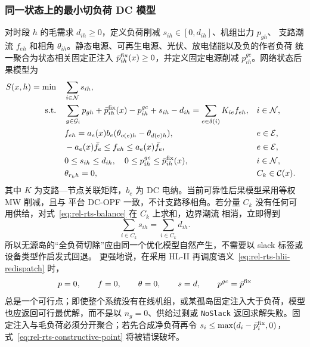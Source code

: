\subsubsection{同一状态上的最小切负荷 DC 模型}
对时段 $h$ 的毛需求 $d_{ih}\ge0$，定义负荷削减 $s_{ih}\in[0,d_{ih}]$、机组出力 $p_{gh}$、
支路潮流 $f_{eh}$ 和相角 $\theta_{ih}$。静态电源、可再生电源、光伏、放电储能以及负的作者负荷
统一聚合为状态相关固定正注入 $\bar p^{\rm fix}_{ih}(x)\ge0$，并定义固定电源削减
$p^{gc}_{ih}$。网络状态后果模型为
\begin{subequations}\label{eq:rel-rts-dcopf}
\begin{align}
 S(x,h)=\min\quad & \sum_{i\in\mathcal N}s_{ih}, \label{eq:rel-rts-dcopf-obj}\\
 \text{s.t.}\quad
&\sum_{g\in\mathcal G_i}p_{gh}+\bar p^{\rm fix}_{ih}(x)-p^{gc}_{ih}
  +s_{ih}-d_{ih}
   =\sum_{e\in\delta(i)}K_{ie}f_{eh}, &&i\in\mathcal N,\label{eq:rel-rts-balance}\\
&f_{eh}=a_e(x)b_e(\theta_{o(e)h}-\theta_{d(e)h}), &&e\in\mathcal E,\label{eq:rel-rts-flow}\\
&-a_e(x)\bar f_e\le f_{eh}\le a_e(x)\bar f_e, &&e\in\mathcal E,\label{eq:rel-rts-limit}\\
&0\le s_{ih}\le d_{ih},\quad
  0\le p^{gc}_{ih}\le\bar p^{\rm fix}_{ih}(x), &&i\in\mathcal N,\label{eq:rel-rts-shed}\\
 &\theta_{r_kh}=0, &&C_k\in\mathcal C(x).\label{eq:rel-rts-ref}
\end{align}
\end{subequations}
其中 $K$ 为支路—节点关联矩阵，$b_e$ 为 DC 电纳。当前可靠性后果模型采用等权 MW 削减，且与
平台 DC-OPF 一致，不计支路移相角。若分量 $C_k$ 没有任何可用供给，对式~\eqref{eq:rel-rts-balance} 在 $C_k$ 上求和，边界潮流
相消，立即得到
\begin{equation}
 \sum_{i\in C_k}s_{ih}=\sum_{i\in C_k}d_{ih}.
 \label{eq:rel-rts-dead-island}
\end{equation}
所以无源岛的“全负荷切除”应由同一个优化模型自然产生，不需要以 slack 标签或设备类型作启发式回退。
更强地说，在采用 HL-II 再调度语义~\eqref{eq:rel-rts-hlii-redispatch} 时，
\begin{equation}
 p=0,\qquad f=0,\qquad \theta=0,\qquad s=d,\qquad
 p^{gc}=\bar p^{\rm fix}
 \label{eq:rel-rts-constructive-point}
\end{equation}
总是一个可行点；即使整个系统没有在线机组，或某孤岛固定注入大于负荷，模型也应返回可行最优解，而不是以
$n_g=0$、供给过剩或 \texttt{NoSlack} 返回求解失败。固定注入与毛负荷必须分开聚合；若先合成净负荷再令
$s_i\le\max(d_i-\bar p_i^{\rm fix},0)$，式~\eqref{eq:rel-rts-constructive-point} 将被错误破坏。

